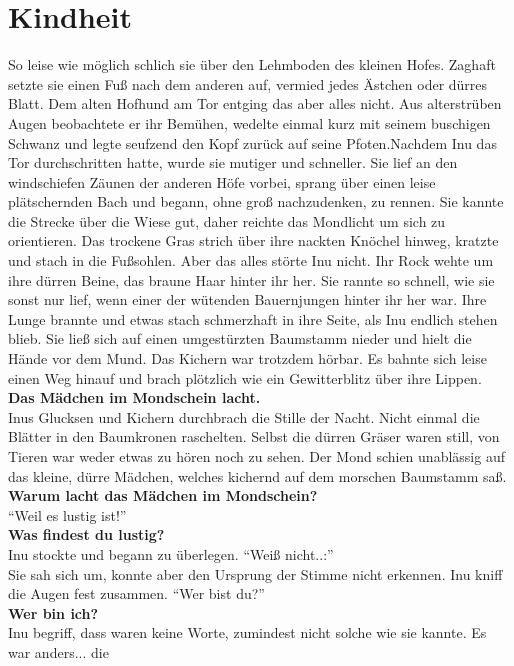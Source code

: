 \chapter{Kindheit}


So leise wie möglich schlich sie über den Lehmboden des kleinen Hofes. Zaghaft setzte sie einen 
Fuß nach dem anderen auf, vermied jedes Ästchen oder dürres Blatt. Dem alten Hofhund am Tor entging 
das aber alles nicht. Aus alterstrüben Augen beobachtete er ihr Bemühen, wedelte einmal kurz mit 
seinem buschigen Schwanz und legte seufzend den Kopf zurück auf seine Pfoten.Nachdem Inu das Tor 
durchschritten hatte, wurde sie mutiger und schneller. Sie lief an den windschiefen Zäunen der 
anderen Höfe vorbei, sprang über einen leise plätschernden Bach und begann, ohne groß nachzudenken, 
zu rennen. Sie kannte die Strecke über die Wiese gut, daher reichte das Mondlicht um sich zu 
orientieren. Das trockene Gras strich über ihre nackten Knöchel hinweg, kratzte und stach in die 
Fußsohlen. Aber das alles störte Inu nicht. Ihr Rock wehte um ihre dürren Beine, das braune Haar 
hinter ihr her. Sie rannte so schnell, wie sie sonst nur lief, wenn einer der wütenden Bauernjungen 
hinter ihr her war. Ihre Lunge brannte und etwas stach schmerzhaft in ihre Seite, als Inu endlich 
stehen blieb. Sie ließ sich auf einen umgestürzten Baumstamm nieder und hielt die Hände vor dem 
Mund. Das Kichern war trotzdem hörbar. Es bahnte sich leise einen Weg hinauf und brach plötzlich 
wie 
ein Gewitterblitz über ihre Lippen.\\
\textbf{Das Mädchen im Mondschein lacht.}\\
Inus Glucksen und Kichern durchbrach die Stille der Nacht. Nicht einmal die Blätter in den 
Baumkronen raschelten. Selbst die dürren Gräser waren still, von Tieren war weder etwas zu hören 
noch zu sehen. Der Mond schien unablässig auf das kleine, dürre Mädchen, welches kichernd auf dem 
morschen Baumstamm saß.\\
\textbf{Warum lacht das Mädchen im Mondschein?}\\
``Weil es lustig ist!''\\
\textbf{Was findest du lustig?}\\
Inu stockte und begann zu überlegen. ``Weiß nicht..:''\\
Sie sah sich um, konnte aber den Ursprung der Stimme nicht erkennen. Inu kniff die Augen fest 
zusammen. ``Wer bist du?''\\
\textbf{Wer bin ich?}\\
Inu begriff, dass waren keine Worte, zumindest nicht solche wie sie kannte. Es war anders... die 
